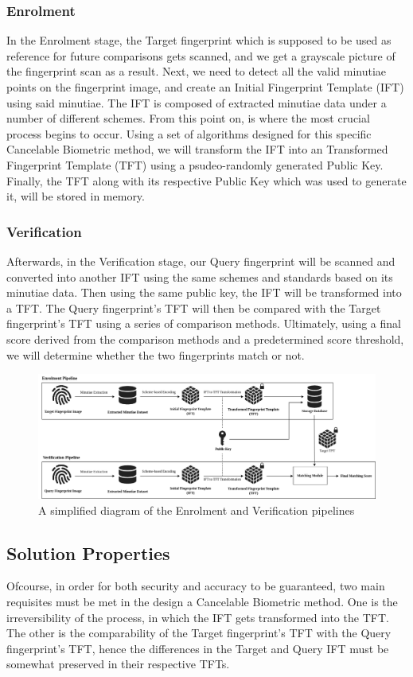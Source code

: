\documentclass[fyp]{socreport}
\begin{document}
\subsubsection{Enrolment}
In the Enrolment stage, the Target fingerprint which is supposed to be used as reference for future comparisons gets scanned, and we get a grayscale picture of the fingerprint scan as a result. Next, we need to detect all the valid minutiae points on the fingerprint image, and create an Initial Fingerprint Template (IFT) using said minutiae. The IFT is composed of extracted minutiae data under a number of different schemes. From this point on, is where the most crucial process begins to occur. Using a set of algorithms designed for this specific Cancelable Biometric method, we will transform the IFT into an Transformed Fingerprint Template (TFT) using a psudeo-randomly generated Public Key. Finally, the TFT along with its respective Public Key which was used to generate it, will be stored in memory.

\subsubsection{Verification}
Afterwards, in the Verification stage, our Query fingerprint will be scanned and converted into another IFT using the same schemes and standards based on its minutiae data. Then using the same public key, the IFT will be transformed into a TFT. The Query fingerprint's TFT will then be compared with the Target fingerprint's TFT using a series of comparison methods. Ultimately, using a final score derived from the comparison methods and a predetermined score threshold, we will determine whether the two fingerprints match or not.

\begin{figure}[H]
	\centering
	\includegraphics[width=1\textwidth]
	{General_Pipeline}
	\caption{A simplified diagram of the Enrolment and Verification pipelines}
\end{figure}

\subsection{Solution Properties}
Ofcourse, in order for both security and accuracy to be guaranteed, two main requisites must be met in the design a Cancelable Biometric method. One is the irreversibility of the process, in which the IFT gets transformed into the TFT. The other is the comparability of the Target fingerprint's TFT with the Query fingerprint's TFT, hence the differences in the Target and Query IFT must be somewhat preserved in their respective TFTs.
\end{document}
